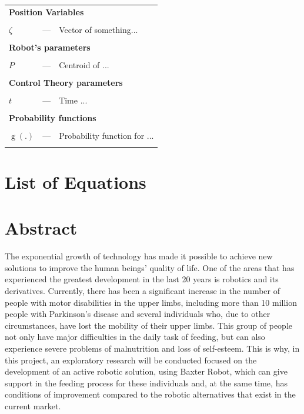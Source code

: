 \documentclass[11pt]{report} %
\DeclareMathOperator{\g}{g}
\begin{document}
\begin{longtable}{p{5mm} c p{120mm} }

\multicolumn{3}{l}{\textbf{Position Variables}}\\
\\
$\zeta$ & --- & Vector of something...\\
\\
\multicolumn{3}{l}{\textbf{Robot's parameters}}\\
\\
$P$ & --- & Centroid of ...\\

\\
\multicolumn{3}{l}{\textbf{Control Theory parameters}}\\
\\
$t$ & --- & Time ...\\

\\
\multicolumn{3}{l}{\textbf{Probability functions}}\\
\\
$\g(.)$ & --- & Probability function for ...\\

\\


\end{longtable}


\cleardoublepage
\chapter*{List of Equations}

\listofmyequations


\chapter*{Abstract}


The exponential growth of technology has made it possible to achieve new solutions to improve the human beings' quality of life. One of the areas that has experienced the greatest development in the last 20 years is robotics and its derivatives. Currently, there has been a significant increase in the number of people with motor disabilities in the upper limbs, including more than 10 million people with Parkinson's disease and several individuals who, due to other circumstances, have lost the mobility of their upper limbs. This group of people not only have major difficulties in the daily task of feeding, but can also experience severe problems of malnutrition and loss of self-esteem. This is why, in this project, an exploratory research will be conducted focused on the development of an active robotic solution, using Baxter Robot, which can give support in the feeding process for these individuals and, at the same time, has conditions of improvement compared to the robotic alternatives that exist in the current market.\\
\end{document}
